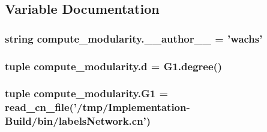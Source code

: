 \subsection{Variable Documentation}
\hypertarget{namespacecompute__modularity_a9cd9e5b7597978a2a0170d03da499086}{
\subsubsection[{\+\_\+\+\_\+author\+\_\+\+\_\+}]{\setlength{\rightskip}{0pt plus 5cm}string compute\+\_\+modularity.\+\_\+\+\_\+author\+\_\+\+\_\+ = 'wachs'}}\label{namespacecompute__modularity_a9cd9e5b7597978a2a0170d03da499086}
\hypertarget{namespacecompute__modularity_ad4ed0b5425c72d4dce599bc986780466}{
\subsubsection[{d}]{\setlength{\rightskip}{0pt plus 5cm}tuple compute\+\_\+modularity.\+d = G1.\+degree()}}\label{namespacecompute__modularity_ad4ed0b5425c72d4dce599bc986780466}
\hypertarget{namespacecompute__modularity_abec964e45de0bde923285855ae074cff}{
\subsubsection[{G1}]{\setlength{\rightskip}{0pt plus 5cm}tuple compute\+\_\+modularity.\+G1 = {\bf read\+\_\+cn\+\_\+file}('/tmp/Implementation-\/Build/bin/labels\+Network.\+cn')}}\label{namespacecompute__modularity_abec964e45de0bde923285855ae074cff}
